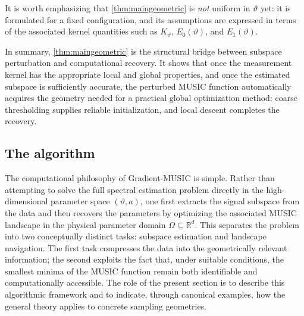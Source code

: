 \documentclass[11pt]{article}
\theoremstyle{definition}
\numberwithin{theorem}{section}
\numberwithin{lemma}{section}
\numberwithin{equation}{section}
\def\R{\mathbb{R}}
\renewcommand{\subset}{\subseteq}
\newcommand{\domain}{\Omega}
\newcommand{\bfa}{a}
\numberwithin{equation}{section}
\begin{document}
It is worth emphasizing that \cref{thm:maingeometric} is {\em not} uniform in $\vartheta$ yet: it is formulated for a fixed configuration, and its assumptions are expressed in terms of the associated kernel quantities such as $K_\vartheta$, $E_0(\vartheta)$, and $E_1(\vartheta)$. 

In summary, \cref{thm:maingeometric} is the structural bridge between subspace perturbation and computational recovery. It shows that once the measurement kernel has the appropriate local and global properties, and once the estimated subspace is sufficiently accurate, the perturbed MUSIC function automatically acquires the geometry needed for a practical global optimization method: coarse thresholding supplies reliable initialization, and local descent completes the recovery.

\subsection{The algorithm}
\label{sec:examples}

The computational philosophy of Gradient-MUSIC is simple. Rather than attempting to solve the full spectral estimation problem directly in the high-dimensional parameter space $(\vartheta,\bfa)$, one first extracts the signal subspace from the data and then recovers the parameters by optimizing the associated MUSIC landscape in the physical parameter domain $\domain\subset\R^d$. This separates the problem into two conceptually distinct tasks: subspace estimation and landscape navigation. The first task compresses the data into the geometrically relevant information; the second exploits the fact that, under suitable conditions, the smallest minima of the MUSIC function remain both identifiable and computationally accessible. The role of the present section is to describe this algorithmic framework and to indicate, through canonical examples, how the general theory applies to concrete sampling geometries.
\end{document}

